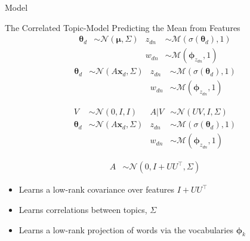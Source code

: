 \documentclass[xcolor=dvipsnames]{beamer}
\newcommand \T { ^\top }
\newcommand \vv[1] { \boldsymbol #1 }
\newcommand \thd[0]  { { \vv \theta_d } }
\newcommand \xd      { { \vv x_d } }
\newcommand \nor[2]   { \mathcal{N} \left( {#1}, {#2} \right) }
\newcommand \mnor[3]  { \mathcal{N} \left(#1, #2, #3\right) }
\newcommand \muln[2]  { \mathcal{M} \left( {#1},{#2} \right) }
\begin{document}
\begin{frame}{Model}

 { The Correlated Topic-Model }
 { Predicting the Mean from Features}
 {
    \begin{align*}
    \vv{\theta}_d & \sim \nor{\vv{\mu}}{\Sigma} & z_{dn} & \sim \muln{\sigma(\thd)}{1} \\
    & & w_{dn} & \sim \muln{\vv{\phi}_{z_{dn}}}{1} 
    \end{align*}
}
 {
    \begin{align*}
    \vv{\theta}_d & \sim \nor{A\xd}{\Sigma} & z_{dn} & \sim \muln{\sigma(\thd)}{1} \\
    & & w_{dn} & \sim \muln{\vv{\phi}_{z_{dn}}}{1} 
    \end{align*}
}

 {
    \begin{align*}
    V & \sim \mnor{0}{I}{I} & A|V & \sim \mnor{UV}{I}{\Sigma} \\
    \vv{\theta}_d & \sim \nor{A\xd}{\Sigma} & z_{dn} & \sim \muln{\sigma(\thd)}{1} \\
    & & w_{dn} & \sim \muln{\vv{\phi}_{z_{dn}}}{1} 
    \end{align*}
}

 {
    \begin{align*}
    A & \sim \mnor{0}{I + UU\T}{\Sigma} 
    \end{align*}
}

 {
    \begin{itemize}
        \item Learns a low-rank covariance over features $I + UU\T$
        \item Learns correlations between topics, $\Sigma$
        \item Learns a low-rank projection of words via the vocabularies $\vv{\phi}_k$
    \end{itemize}
}


\end{frame}

\end{document}
